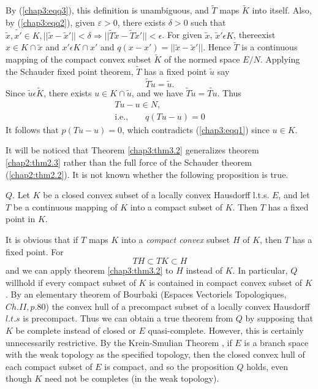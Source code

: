  By (\ref{chap3:eqq3}), this definition is unambiguous, and $\tilde{T}$ maps
 $\tilde{K}$ into itself. Also, by (\ref{chap3:eqq2}), given
 $\varepsilon > 0 $, there 
 exists $\delta > 0$ such that $\tilde{x}, \tilde{x'} \in K, ||
 \tilde{x}-\tilde{x}' || < \delta \Rightarrow || \tilde{T} \tilde{x}-
 \tilde{T}\tilde{x}'|| < \epsilon$. For given $\tilde{x}$, $\tilde{x}'
 \epsilon K$, there\pageoriginale exist $x \in K \cap \tilde{x}$ and $x'
 \epsilon K \cap x'$ and $q(x-x')= || \tilde{x}- \tilde{x}'||$. Hence
 $\tilde{T}$ is a continuous mapping of the compact convex subset
 $\tilde{K}$ of the normed space $E/N$. Applying the Schauder fixed
 point theorem, $\tilde{T}$ has a fixed point $\tilde{u}$ say 
 $$
 \tilde{T}\tilde{u}= \tilde{u}.
 $$
 Since $\tilde{u} \epsilon \tilde{K}$, there exists $u \in K \cap
 \tilde{u}$, and we have $\tilde{T} \tilde{u}= \widetilde{T u}$. 
 Thus 
 \begin{gather*}
   Tu- u \in N,\\
   \text{i.e.,}\qquad q(Tu-u)=0
 \end{gather*}
 It follows that $p(Tu-u)=0$, which contradicts (\ref{chap3:eqq1})
 since $u  \in K$.  
  
\begin{problem}
  It will be noticed that Theorem \ref{chap3:thm3.2} generalizes
  theorem \ref{chap2:thm2.3} 
  rather than the full force of the Schauder theorem
  (\ref{chap2:thm2.2}). It is 
  not known whether the following proposition is true. 
\end{problem}
 
$Q$. Let $K$ be a closed convex subset of a locally convex Hausdorff
l.t.s. $E$, and let $T$ be a continuous mapping of $K$ into a compact
subset of $K$. Then $T$ has a fixed point in $K$. 
 
It is obvious that if $T$ maps $K$ into a \textit{compact convex}
subset $H$ of $K$, then $T$ has a fixed point. For  
$$
T H \subset T K \subset H
$$
and we can apply theorem \ref{chap3:thm3.2} to $H$ instead of $K$. In
particular, 
$Q$ will\pageoriginale hold if every compact subset of $K$ is
contained in compact 
convex subset of $K$. By an elementary theorem of Bourbaki (Espaces
Vectoriels Topologiques, $Ch. II, p. 80$) the convex hull of a
precompact subset of a locally convex Hausdorff $l.t.s$ is
precompact. Thus we can obtain a true theorem from $Q$ by supposing
that $K$ be complete instead of closed or $E$ quasi-complete. However,
this is certainly unnecessarily restrictive. By the Krein-Smulian
Theorem \cite{key21}, if $E$ is a branch space with the weak topology as the
specified topology, then the closed convex hull of each compact subset
of $E$ is compact, and so the proposition $Q$ holds, even though $K$
need not be completes (in the weak topology). 

